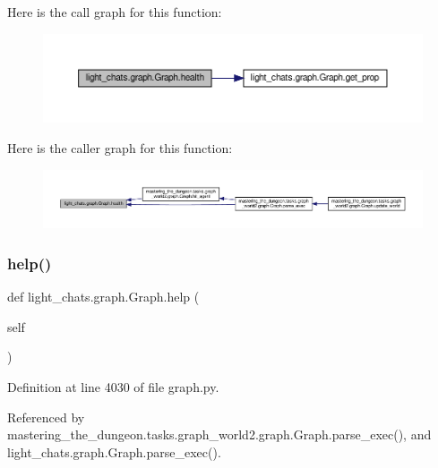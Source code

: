 Here is the call graph for this function\+:
\nopagebreak
\begin{figure}[H]
\begin{center}
\leavevmode
\includegraphics[width=350pt]{classlight__chats_1_1graph_1_1Graph_a3709592a97b55342b767bedb9db16267_cgraph}
\end{center}
\end{figure}
Here is the caller graph for this function\+:
\nopagebreak
\begin{figure}[H]
\begin{center}
\leavevmode
\includegraphics[width=350pt]{classlight__chats_1_1graph_1_1Graph_a3709592a97b55342b767bedb9db16267_icgraph}
\end{center}
\end{figure}
\mbox{\label{classlight__chats_1_1graph_1_1Graph_a6a6d39a24244430a899bbc0b752baf25}} 
\subsubsection{\texorpdfstring{help()}{help()}}
{\footnotesize\ttfamily def light\+\_\+chats.\+graph.\+Graph.\+help (\begin{DoxyParamCaption}\item[{}]{self }\end{DoxyParamCaption})}



Definition at line 4030 of file graph.\+py.



Referenced by mastering\+\_\+the\+\_\+dungeon.\+tasks.\+graph\+\_\+world2.\+graph.\+Graph.\+parse\+\_\+exec(), and light\+\_\+chats.\+graph.\+Graph.\+parse\+\_\+exec().

